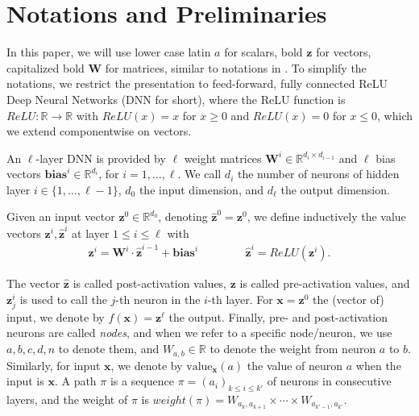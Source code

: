 \documentclass[a4paper,UKenglish,cleveref, autoref, thm-restate]{lipics-v2021}
\newcommand{\vz}{\boldsymbol{z}}
\newcommand{\vb}{\boldsymbol{bias}}
\newcommand{\val}{{\textrm{value}}}
\begin{document}
	
	
	
	
	\section{Notations and Preliminaries}
	
	In this paper, we will use lower case latin $a$ for scalars, bold $\boldsymbol{z}$ for vectors, 
	capitalized bold $\boldsymbol{W}$ for matrices, similar to notations in \cite{prima,crown}.
	To simplify the notations, we restrict the presentation to feed-forward, 
	fully connected ReLU Deep Neural Networks (DNN for short), where the ReLU function is $ReLU : \mathbb{R} \rightarrow \mathbb{R}$ with
	$ReLU(x)=x$ for $x \geq 0$ and $ReLU(x)=0$ for $x \leq 0$, which we extend componentwise on vectors.
	
	
	
	
	An $\ell$-layer DNN is provided by $\ell$ weight matrices 
	$\boldsymbol{W}^i \in \mathbb{R}^{d_i\times d_{i-1}}$
	and $\ell$ bias vectors $\vb^i \in \mathbb{R}^{d_i}$, for $i=1, \ldots, \ell$.
	We call $d_i$ the number of neurons of hidden layer $i \in \{1, \ldots, \ell-1\}$,
	$d_0$ the input dimension, and $d_\ell$ the output dimension.
	
	Given an input vector $\boldsymbol{z}^0 \in \mathbb{R}^{d_0}$, 
	denoting $\hat{\boldsymbol{z}}^{0}={\boldsymbol{z}}^0$, we define inductively the value vectors $\boldsymbol{z}^i,\hat{\vz}^i$ at layer $1 \leq i \leq \ell$ with
	\begin{align*}
		\boldsymbol{z}^{i} = \boldsymbol{W}^i\cdot \hat{\boldsymbol{z}}^{i-1}+ \vb^i \qquad \, \qquad
		\hat{\boldsymbol{z}}^{i} = ReLU({\boldsymbol{z}}^i).
	\end{align*} 
	
	The vector $\hat{\boldsymbol{z}}$ is called post-activation values, 
	$\boldsymbol{z}$ is called pre-activation values, 
	and $\boldsymbol{z}^{i}_j$ is used to call the $j$-th neuron in the $i$-th layer. 
	For $\boldsymbol{x}=\vz^0$ the (vector of) input, we denote by $f(\boldsymbol{x})=\vz^\ell$ the output. Finally, pre- and post-activation neurons are called \emph{nodes}, and when we refer to a specific node/neuron, we use $a,b,c,d,n$ to denote them, and $W_{a,b} \in \mathbb{R}$ to denote the weight from neuron $a$ to $b$. Similarly, for input $\boldsymbol{x}$, we denote by $\val_{\boldsymbol{x}}(a)$ the value of neuron $a$ when the input is $\boldsymbol{x}$. A path $\pi$ is a sequence $\pi=(a_i)_{k \leq  i \leq k'}$ of neurons in consecutive layers, and the weight of $\pi$ is 
	$weight(\pi)=W_{a_k,a_{k+1}} \times \cdots \times  W_{a_{k'-1},a_{k'}}$.
	
\end{document}
